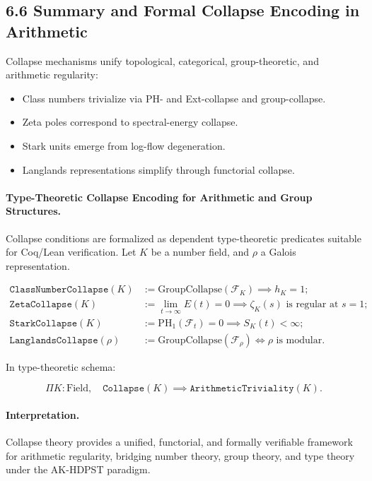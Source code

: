 \documentclass[11pt]{article}
\begin{document}
\subsection*{6.6 Summary and Formal Collapse Encoding in Arithmetic}

Collapse mechanisms unify topological, categorical, group-theoretic, and arithmetic regularity:

\begin{itemize}
    \item Class numbers trivialize via PH- and Ext-collapse and group-collapse.
    \item Zeta poles correspond to spectral-energy collapse.
    \item Stark units emerge from log-flow degeneration.
    \item Langlands representations simplify through functorial collapse.
\end{itemize}

\paragraph{Type-Theoretic Collapse Encoding for Arithmetic and Group Structures.}

Collapse conditions are formalized as dependent type-theoretic predicates suitable for Coq/Lean verification. Let \( K \) be a number field, and \( \rho \) a Galois representation.

\begin{align*}
\texttt{ClassNumberCollapse}(K) &:= \mathrm{GroupCollapse}(\mathcal{F}_K) \implies h_K = 1; \\
\texttt{ZetaCollapse}(K) &:= \lim_{t \to \infty} E(t) = 0 \implies \zeta_K(s) \text{ is regular at } s = 1; \\
\texttt{StarkCollapse}(K) &:= \mathrm{PH}_1(\mathcal{F}_t) = 0 \implies S_K(t) < \infty; \\
\texttt{LanglandsCollapse}(\rho) &:= \mathrm{GroupCollapse}(\mathcal{F}_\rho) \iff \rho \text{ is modular}.
\end{align*}

In type-theoretic schema:

\[
\Pi K : \mathrm{Field}, \quad \texttt{Collapse}(K) \implies \texttt{ArithmeticTriviality}(K).
\]

\paragraph{Interpretation.}
Collapse theory provides a unified, functorial, and formally verifiable framework for arithmetic regularity, bridging number theory, group theory, and type theory under the AK-HDPST paradigm.
\end{document}
